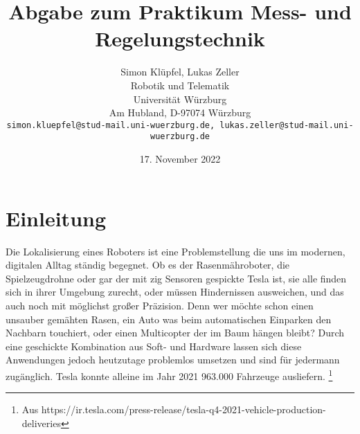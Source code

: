 \documentclass[11pt,a4paper]{article}
\begin{document}
\title{\Large\bf Abgabe zum Praktikum Mess- und Regelungstechnik }

\author{Simon Klüpfel, Lukas Zeller\\
  Robotik und Telematik \\
  Universität Würzburg\\
  Am Hubland, D-97074 Würzburg\\
{\small \texttt{simon.kluepfel@stud-mail.uni-wuerzburg.de, lukas.zeller@stud-mail.uni-wuerzburg.de}}
}
\date{17. November 2022}

\maketitle

\section{Einleitung}
Die Lokalisierung eines Roboters ist eine Problemstellung die uns im modernen, digitalen Alltag ständig begegnet. Ob es der Rasenmähroboter, die Spielzeugdrohne oder gar der mit zig Sensoren
gespickte Tesla ist, sie alle finden sich in ihrer Umgebung zurecht, oder müssen Hindernissen ausweichen, und das auch noch mit möglichst großer Präzision. Denn wer möchte schon einen 
unsauber gemähten Rasen, ein Auto was beim automatischen Einparken den Nachbarn touchiert, oder einen Multicopter der im Baum hängen bleibt? 
Durch eine geschickte Kombination aus Soft- und Hardware lassen sich diese Anwendungen jedoch heutzutage problemlos umsetzen und sind für jedermann zugänglich. 
Tesla konnte alleine im Jahr 2021 963.000 Fahrzeuge ausliefern. \footnote{Aus https://ir.tesla.com/press-release/tesla-q4-2021-vehicle-production-deliveries} 
\end{document}
